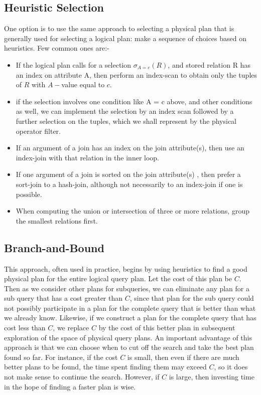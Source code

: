 \subsection{Heuristic Selection}
One option is to use the same approach to selecting a physical plan that is generally used for selecting a logical plan: make a sequence of choices based on heuristics. Few common ones are:-
\begin{itemize}
    \item If the logical plan calls for a selection  $\sigma_{A=c}(R)$, and stored relation R has an index on attribute A, then perform an index-scan to obtain only the tuples of $R$ with $A-$value equal to $c$.
    \item if the selection involves one condition like A = c above, and other conditions as well, we can implement the selection by an index­ scan followed by a further selection on the tuples, which we shall represent by the physical operator filter.
    \item If an argument of a join has an index on the join attribute(s), then use an index-join with that relation in the inner loop.
    \item If one argument of a join is sorted on the join attribute(s) , then prefer a sort-join to a hash-join, although not necessarily to an index-join if one is possible.
    \item When computing the union or intersection of three or more relations, group the smallest relations first.
\end{itemize}

\subsection{Branch-and-Bound}
This approach, often used in practice, begins by using heuristics to find a good physical plan for the entire logical query plan. Let the cost of this plan be $C$. Then as we consider other plans for subqueries, we can eliminate any plan for a sub query that has a cost greater than $C$, since that plan for the sub query could not possibly participate in a plan for the complete query that is better than what we already know. Likewise, if we construct a plan for the complete query that has cost less than $C$, we replace $C$ by the cost of this better plan in subsequent exploration of the space of physical query plans. An important advantage of this approach is that we can choose when to cut off the search and take the best plan found so far. For instance, if the cost $C$ is small, then even if there are much better plans to be found, the time spent finding them may exceed $C$, so it does not make sense to continue the search. However, if $C$ is large, then investing time in the hope of finding a faster plan is wise.

